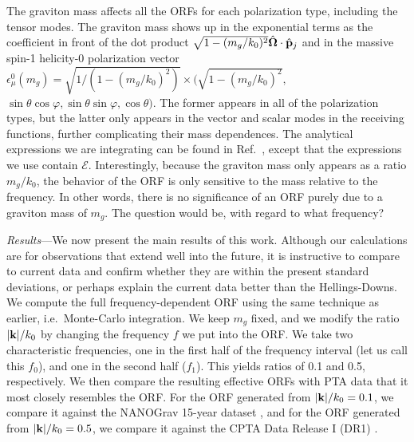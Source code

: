 \documentclass[prd,twocolumn,aps,psfig,nofootinbib,nobibnotes,superscriptaddress,preprintnumbers,times]{revtex4-2}
\begin{document}
The graviton mass affects all the ORFs for each polarization type, including the tensor modes. The graviton mass shows up in the exponential terms as the coefficient in front of the dot product $\sqrt{1 - (m_g/k_0)^2}\hat{\bf \Omega}\cdot \hat{\bf p}_j$ and in the massive spin-1 helicity-0 polarization vector $\epsilon_\mu^0(m_g) = \sqrt{1 / (1 - (m_g/k_0)^2)}\times (\sqrt{1 - (m_g/k_0)^2},$ $\sin\theta\cos\varphi, \sin\theta\sin\varphi, \cos\theta)$. The former appears in all of the polarization types, but the latter only appears in the vector and scalar modes in the receiving functions, further complicating their mass dependences. The analytical expressions we are integrating can be found in Ref.\ \cite{Liang:2021bct}, except that the expressions we use contain $\mathcal{E}$. Interestingly, because the graviton mass only appears as a ratio $m_g / k_0$, the behavior of the ORF is only sensitive to the mass relative to the frequency. In other words, there is no significance of an ORF purely due to a graviton mass of $m_g$. The question would be, with regard to what frequency?

\textit{Results}---We now present the main results of this work. Although our calculations are for observations that extend well into the future, it is instructive to compare to current data and confirm whether they are within the present standard deviations, or perhaps explain the current data better than the Hellings-Downs. We compute the full frequency-dependent ORF using the same technique as earlier, i.e.\ Monte-Carlo integration. We keep $m_g$ fixed, and we modify the ratio $|{\bf k}|/k_0$ by changing the frequency $f$ we put into the ORF. We take two characteristic frequencies, one in the first half of the frequency interval (let us call this $f_0$), and one in the second half ($f_1$). This yields ratios of 0.1 and 0.5, respectively. We then compare the resulting effective ORFs with PTA data that it most closely resembles the ORF. For the ORF generated from $|{\bf k}|/k_0 = 0.1$, we compare it against the NANOGrav 15-year dataset \cite{Agazie:2023, Xu:2023wog}, and for the ORF generated from $|{\bf k}|/k_0 = 0.5$, we compare it against the CPTA Data Release I (DR1) \cite{Xu:2023wog}.
\end{document}
